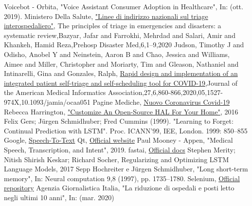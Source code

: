 \documentclass[conference]{IEEEtran}
\begin{document}
\begin{thebibliography}{00}
     Voicebot - Orbita, "Voice Assistant Consumer Adoption in Healthcare", In: (ott. 2019).
     Ministero Della Salute, \href{http://www.salute.gov.it/imgs/C_17_notizie_3849_listaFile_itemName_1_file.pdf}{"Linee di indirizzo nazionali sul triage interospedaliero"},
     The principles of triage in emergencies and disasters: a systematic review,Bazyar, Jafar and Farrokhi, Mehrdad and Salari, Amir and Khankeh, Hamid Reza,Prehosp Disaster Med,6,1--9,2020
     Judson, Timothy J and Odisho, Anobel Y and Neinstein, Aaron B and Chao, Jessica and Williams, Aimee and Miller, Christopher and Moriarty, Tim and Gleason, Nathaniel and Intinarelli, Gina and Gonzales, Ralph, \href{https://doi.org/10.1093/jamia/ocaa051}{Rapid design and implementation of an integrated patient self-triage and self-scheduling tool for COVID-19},Journal of the American Medical Informatics Association,27,6,860-866,2020,05,1527-974X,10.1093/jamia/ocaa051
     Pagine Mediche, \href{https://www.paginemediche.it/coronavirus}{Nuovo Coronavirus Covid-19}
     Rebecca Harrington, \href{https://www.popsci.com/ultimate-diy-ai/}{"Customize An Open-Source HAL For Your Home"}, 2016
     Felix Gers; Jürgen Schmidhuber; Fred Cummins (1999). "Learning to Forget: Continual Prediction with LSTM". Proc. ICANN'99, IEE, London. 1999: 850–855
     Google, \href{https://cloud.google.com/speech-to-text}{Speech-To-Text}
     Qt, \href{https://www.qt.io/}{Official website}
     Paul Mooney - Appen, "Medical Speech, Transcription, and Intent", 2019.
     fastai, \href{https://docs.fast.ai/}{Official docs}
     Stephen Merity; Nitish Shirish Keskar; Richard Socher, Regularizing and Optimizing LSTM Language Models, 2017
     Sepp Hochreiter e Jürgen Schmidhuber, "Long short-term memory", In: Neural computation 9,8 (1997), pp. 1735–1780.
     Selenium, \href{https://github.com/SeleniumHQ/selenium}{Official repository}
     Agenzia Giornalistica Italia, "La riduzione di ospedali e posti letto negli ultimi 10 anni", In: (mar. 2020)
\end{thebibliography}
\end{document}
